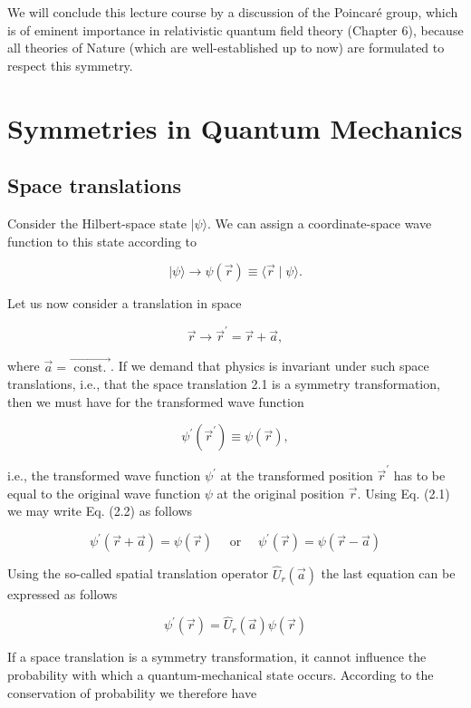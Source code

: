 \documentclass[10pt, letterpaper]{article}
\begin{document}
We will conclude this lecture course by a discussion of the Poincaré group, which is of eminent importance in relativistic quantum field theory (Chapter 6), because all theories of Nature (which are well-established up to now) are formulated to respect this symmetry.

\section{Symmetries in Quantum Mechanics}

\subsection{Space translations}

Consider the Hilbert-space state $|\psi\rangle$. We can assign a coordinate-space wave function to this state according to

$$
|\psi\rangle \longrightarrow \psi(\vec{r}) \equiv\langle\vec{r} \mid \psi\rangle .
$$

Let us now consider a translation in space

$$
\vec{r} \longrightarrow \vec{r}^{\prime}=\vec{r}+\vec{a},
$$

where $\vec{a}=\overrightarrow{\text { const. }}$. If we demand that physics is invariant under such space translations, i.e., that the space translation 2.1 is a symmetry transformation, then we must have for the transformed wave function

$$
\psi^{\prime}\left(\vec{r}^{\prime}\right) \equiv \psi(\vec{r}),
$$

i.e., the transformed wave function $\psi^{\prime}$ at the transformed position $\vec{r}^{\prime}$ has to be equal to the original wave function $\psi$ at the original position $\vec{r}$. Using Eq. (2.1) we may write Eq. (2.2) as follows

$$
\psi^{\prime}(\vec{r}+\vec{a})=\psi(\vec{r}) \quad \text { or } \quad \psi^{\prime}(\vec{r})=\psi(\vec{r}-\vec{a})
$$

Using the so-called spatial translation operator $\hat{U}_{r}(\vec{a})$ the last equation can be expressed as follows

$$
\psi^{\prime}(\vec{r})=\hat{U}_{r}(\vec{a}) \psi(\vec{r})
$$

If a space translation is a symmetry transformation, it cannot influence the probability with which a quantum-mechanical state occurs. According to the conservation of probability we therefore have
\end{document}
